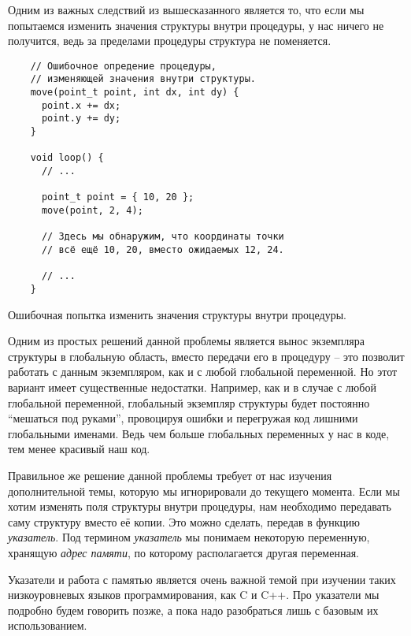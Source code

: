 \documentclass[../sparc.tex]{subfiles}
\begin{document}
Одним из важных следствий из вышесказанного является то, что если мы попытаемся
изменить значения структуры внутри процедуры, у нас ничего не получится, ведь за
пределами процедуры структура не поменяется.

\begin{listing}[H]
  \begin{verbatim}
    // Ошибочное опредение процедуры,
    // изменяющей значения внутри структуры.
    move(point_t point, int dx, int dy) {
      point.x += dx;
      point.y += dy;
    }

    void loop() {
      // ...

      point_t point = { 10, 20 };
      move(point, 2, 4);

      // Здесь мы обнаружим, что координаты точки
      // всё ещё 10, 20, вместо ожидаемых 12, 24.

      // ...
    }
  \end{verbatim}
  \caption{Ошибочная попытка изменить значения структуры внутри процедуры.}
  \label{listing:game-dev-structure-usage-01}
\end{listing}

Одним из простых решений данной проблемы является вынос экземпляра структуры в
глобальную область, вместо передачи его в процедуру -- это позволит работать с
данным экземпляром, как и с любой глобальной переменной.  Но этот вариант имеет
существенные недостатки.  Например, как и в случае с любой глобальной
переменной, глобальный экземпляр структуры будет постоянно ``мешаться под
руками'', провоцируя ошибки и перегружая код лишними глобальными именами.  Ведь
чем больше глобальных переменных у нас в коде, тем менее красивый наш код.

 Правильное же решение данной проблемы требует
от нас изучения дополнительной темы, которую мы игнорировали до текущего
момента.  Если мы хотим изменять поля структуры внутри процедуры, нам необходимо
передавать саму структуру вместо её копии. Это можно сделать, передав в функцию
\emph{указатель}.  Под термином \emph{указатель} мы понимаем некоторую
переменную, хранящую \emph{адрес памяти}, по которому располагается другая
переменная.

Указатели и работа с памятью является очень важной темой при изучении таких
низкоуровневых языков программирования, как C и C++.  Про указатели мы подробно
будем говорить позже, а пока надо разобраться лишь с базовым их использованием.
\end{document}
